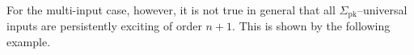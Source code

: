 \documentclass[journal,twoside,web]{ieeecolor}
\begin{document}

For the multi-input case, however, it is not true in general that all $\Sigma_\text{pk}$--universal inputs are persistently exciting of order $n+1$. This is shown by the following example.
\end{document}

